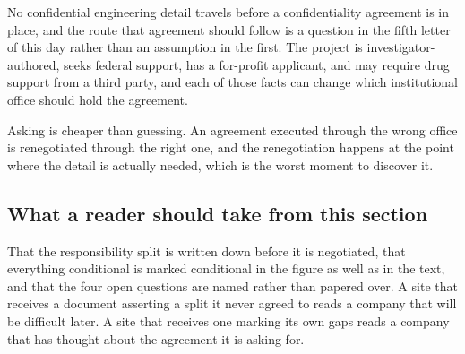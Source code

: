 No confidential engineering detail travels before a confidentiality agreement is
in place, and the route that agreement should follow is a question in the fifth
letter of this day rather than an assumption in the first. The project is
investigator-authored, seeks federal support, has a for-profit applicant, and may
require drug support from a third party, and each of those facts can change which
institutional office should hold the agreement.

Asking is cheaper than guessing. An agreement executed through the wrong office
is renegotiated through the right one, and the renegotiation happens at the point
where the detail is actually needed, which is the worst moment to discover it.

\subsection{What a reader should take from this section}

That the responsibility split is written down before it is negotiated, that
everything conditional is marked conditional in the figure as well as in the
text, and that the four open questions are named rather than papered over. A
site that receives a document asserting a split it never agreed to reads a
company that will be difficult later. A site that receives one marking its own
gaps reads a company that has thought about the agreement it is asking for.

